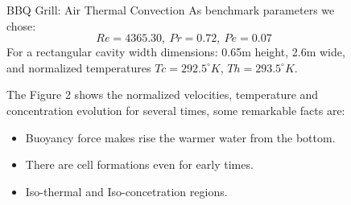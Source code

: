 \documentclass[final]{beamer}
\newlength{\sepwid}
\newlength{\onecolwid}
\newlength{\twocolwid}
\begin{document}
\begin{frame}[t]
\begin{columns}[t]
\begin{column}{\onecolwid}
\end{column} %

\begin{column}{\sepwid}\end{column} %

\begin{column}{\twocolwid} %

\begin{columns}[t,totalwidth=\twocolwid] %

\begin{column}{\onecolwid}\vspace{-.6in} %


\begin{block}{BBQ Grill: Air Thermal Convection}
	As benchmark parameters we chose:
	$$Re=4365.30, \: Pr=0.72, \: Pe=0.07$$
	For a rectangular cavity width dimensions: 0.65m height, 2.6m wide, and normalized temperatures $Tc=292.5^{\circ}K$, $Th=293.5^{\circ}K$.

	\vspace{1em}
	The Figure 2 shows the normalized velocities, temperature and concentration evolution for several times, some remarkable facts are:
	\begin{itemize}
		\item Buoyancy force makes rise the warmer water from the bottom.
		\item There are cell formations even for early times.
		\item Iso-thermal and Iso-concetration regions.
	\end{itemize}
\end{block}


\end{column} %

\begin{column}{\onecolwid}\vspace{-.6in} %



\end{column}
\end{columns}
\end{column}
\end{columns}
\end{frame}
\end{document}
